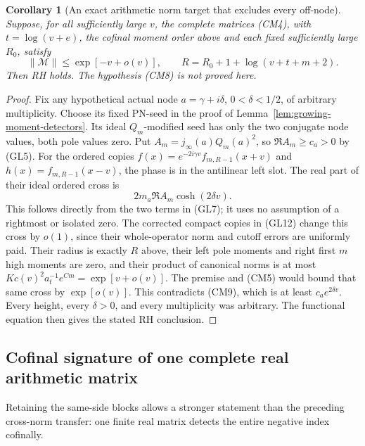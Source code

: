\documentclass[11pt]{article}
\newtheorem{corollary}[theorem]{Corollary}
\theoremstyle{remark}\newtheorem{remark}[theorem]{Remark}
\begin{document}
\begin{corollary}[An exact arithmetic norm target that excludes every off-node]
\label{cor:complete-matrix-rh-transfer}
Suppose, for all sufficiently large \(v\), the complete matrices
(CM4), with \(t=\log(v+e)\), the cofinal moment order above and
each fixed sufficiently large \(R_0\), satisfy
\[
 \|\mathcal M\|\le \exp[-v+o(v)],\qquad
 R=R_0+1+\log(v+t+m+2).                             \tag{CM8}
\]
Then RH holds. The hypothesis (CM8) is not proved here.
\end{corollary}
\begin{proof}
Fix any hypothetical actual node \(a=\gamma+i\delta\),
\(0<\delta<1/2\), of arbitrary multiplicity. Choose its fixed
PN-seed in the proof of Lemma~\ref{lem:growing-moment-detectors}.
Its ideal \(Q_m\)-modified seed has only the two conjugate
node values, both pole values zero. Put
\(A_m=j_\infty(a)Q_m(a)^2\), so \(\Re A_m\ge c_a>0\)
by (GL5). For the ordered copies
\(f(x)=e^{-2i\gamma v}f_{m,R-1}(x+v)\) and
\(h(x)=f_{m,R-1}(x-v)\), the phase is in the antilinear
left slot. The real part of their ideal ordered cross is
\[
                  2m_a\Re A_m\cosh(2\delta v).
                                                               \tag{CM9}
\]
This follows directly from the two terms in (GL7); it uses no
assumption of a rightmost or isolated zero. The corrected
compact copies in (GL12) change this cross by \(o(1)\), since
their whole-operator norm and cutoff errors are uniformly paid.
Their radius is exactly \(R\) above, their left pole moments
and right first \(m\) high moments are zero, and their product
of canonical norms is at most
\(Kc(v)^2a_t^{-1}e^{Cm}=\exp[v+o(v)]\).
The premise and (CM5) would bound that same cross by
\(\exp[o(v)]\). This contradicts (CM9), which is at least
\(c_a e^{2\delta v}\). Every height, every \(\delta>0\), and
every multiplicity was arbitrary. The functional equation
then gives the stated RH conclusion.
\end{proof}

\subsection{Cofinal signature of one complete real arithmetic matrix}
\label{sec:cofinal-real-source-signature}

Retaining the same-side blocks allows a stronger statement than
the preceding cross-norm transfer: one finite real matrix detects
the entire negative index cofinally.
\end{document}

